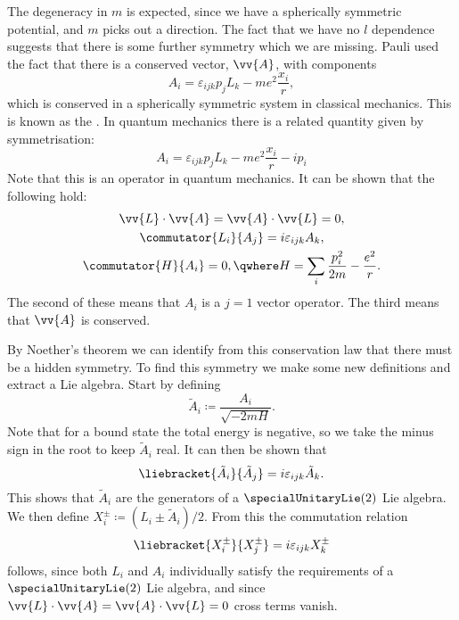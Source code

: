 \documentclass[fleqn]{NotesClass}
\begin{document}
    The degeneracy in \(m\) is expected, since we have a spherically symmetric potential, and \(m\) picks out a direction.
    The fact that we have no \(l\) dependence suggests that there is some further symmetry which we are missing.
    Pauli used the fact that there is a conserved vector, \(\vv{A}\), with components
    \begin{equation}
        A_i = \varepsilon_{ijk}p_jL_k - me^2\frac{x_i}{r},
    \end{equation}
    which is conserved in a spherically symmetric system in classical mechanics.
    This is known as the .
    In quantum mechanics there is a related quantity given by symmetrisation:
    \begin{equation}
        A_i = \varepsilon_{ijk}p_jL_k - me^2\frac{x_i}{r} - ip_i
    \end{equation}
    Note that this is an operator in quantum mechanics.
    It can be shown that the following hold:
    \begin{gather}
        \vv{L} \cdot \vv{A} = \vv{A} \cdot \vv{L} = 0,\\
        \commutator{L_i}{A_j} = i\varepsilon_{ijk}A_k,\\
        \commutator{H}{A_i} = 0, \qwhere H = \sum_i\frac{p_i^2}{2m} - \frac{e^2}{r}.\\
    \end{gather}
    The second of these means that \(A_i\) is a \(j = 1\) vector operator.
    The third means that \(\vv{A}\) is conserved.
    
    By Noether's theorem we can identify from this conservation law that there must be a hidden symmetry.
    To find this symmetry we make some new definitions and extract a Lie algebra.
    Start by defining
    \begin{equation}
        \tilde{A}_i \coloneqq \frac{A_i}{\sqrt{-2mH}}.
    \end{equation}
    Note that for a bound state the total energy is negative, so we take the minus sign in the root to keep \(\tilde{A}_i\) real.
    It can then be shown that
    \begin{equation}
        \liebracket{\tilde{A}_i}{\tilde{A}_j} = i\varepsilon_{ijk}\tilde{A}_k.
    \end{equation}
    This shows that \(\tilde{A}_i\) are the generators of a \(\specialUnitaryLie(2)\) Lie algebra.
    We then define \(X_i^{\pm} \coloneqq (L_i \pm \tilde{A}_i) / 2\).
    From this the commutation relation
    \begin{equation}
        \liebracket{X_i^{\pm}}{X_j^{\pm}} = i\varepsilon_{ijk}X_k^{\pm}
    \end{equation}
    follows, since both \(L_i\) and \(A_i\) individually satisfy the requirements of a \(\specialUnitaryLie(2)\) Lie algebra, and since \(\vv{L} \cdot \vv{A} = \vv{A} \cdot \vv{L} = 0\) cross terms vanish.
    
\end{document}
